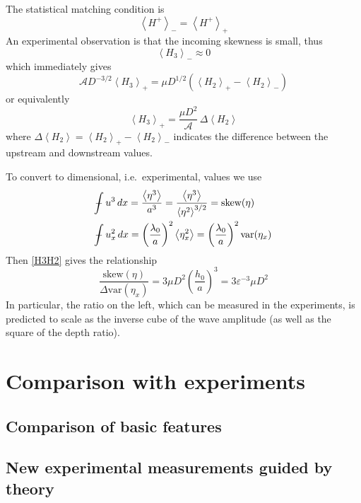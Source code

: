 \documentclass[11pt]{article}
\newcommand{\mean}[1]{\left< #1 \right>}
\newcommand{\eps}{\varepsilon}
\newcommand{\skw}{\text{skew}}
\newcommand{\var}{\text{var}}
\newcommand{\ampp}{\mathcal{A}}
\newcommand{\Hp}{H^{+}}
\newcommand{\meanup}[1]{\mean{#1}_{-}}
\newcommand{\meandn}[1]{\mean{#1}_{+}}
\def\Xint#1{\mathchoice
   {\XXint\displaystyle\textstyle{#1}}%
   {\XXint\textstyle\scriptstyle{#1}}%
   {\XXint\scriptstyle\scriptscriptstyle{#1}}%
   {\XXint\scriptscriptstyle\scriptscriptstyle{#1}}%
   \!\int}
\def\XXint#1#2#3{{\setbox0=\hbox{$#1{#2#3}{\int}$}
     \vcenter{\hbox{$#2#3$}}\kern-.5\wd0}}
\def\dashint{\Xint-}
\newcommand{\intt}{\dashint}%
\newcommand{\dx}{\, dx}
\begin{document}
The statistical matching condition is
\begin{equation}
\meanup{\Hp} = \meandn{\Hp}
\end{equation}
An experimental observation is that the incoming skewness is small, thus
\begin{equation}
\meanup{H_3} \approx 0
\end{equation}
which immediately gives
\begin{equation}
\ampp D^{-3/2} \meandn{H_3} = \mu D^{1/2} \left( \meandn{H_2} - \meanup{H_2} \right)
\end{equation}
or equivalently
\begin{equation}
\label{H3H2}
\meandn{H_3} = \frac{\mu D^{2}}{\ampp} \, \Delta \mean{H_2}
\end{equation}
where $\Delta \mean{H_2} =  \meandn{H_2} - \meanup{H_2}$  indicates the difference between the upstream and downstream values.

To convert to dimensional, i.e.~experimental, values we use
\begin{align}
& \intt u^3 \dx = \frac{\mean{\eta^3}}{a^3} = 
\frac{\mean{\eta^3}}{\mean{\eta^2}^{3/2}} = \skw(\eta) \\
& \intt u_x^2 \dx = \left(\frac{\lambda_0}{a} \right)^2 \mean{\eta_x^2} 
= \left(\frac{\lambda_0}{a} \right)^2 \var(\eta_x)
\end{align}
Then \eqref{H3H2} gives the relationship
\begin{equation}
\frac{\skw(\eta)}{\Delta \var(\eta_x)} =
3 \mu D^2 \left( \frac{h_0}{a} \right)^3 = 3 \eps^{-3} \mu D^2
\end{equation}
In particular, the ratio on the left, which can be measured in the experiments, is predicted to scale as the inverse cube of the wave amplitude (as well as the square of the depth ratio).

\section{Comparison with experiments}

\subsection{Comparison of basic features}

\subsection{New experimental measurements guided by theory}

%
%
\end{document}
